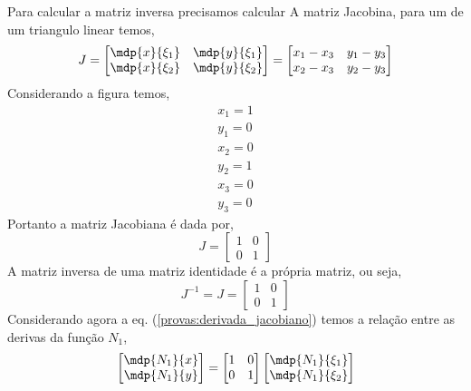 %
Para calcular a matriz inversa precisamos calcular A matriz Jacobina, para um de um triangulo linear temos,
%
\begin{equation}
J =	\begin{bmatrix}
		\mdp{x}{\xi_1}&\mdp{y}{\xi_1}\\
		\mdp{x}{\xi_2}&\mdp{y}{\xi_2}
	\end{bmatrix} =
    \begin{bmatrix}
  		x_1 - x_3&y_1 - y_3\\
	  	x_2 - x_3&y_2 - y_3
    \end{bmatrix} 
\end{equation}
%
Considerando a figura temos,
\begin{equation}
\begin{split}
x_1 = 1\\
y_1 = 0\\
x_2 = 0\\
y_2 = 1\\
x_3 = 0\\
y_3 = 0
\end{split}
\end{equation} 
% 
Portanto a matriz Jacobiana é dada por,
%
\begin{equation}
	J =	\begin{bmatrix}
		1&0\\
		0&1
		\end{bmatrix}
\end{equation}
%
A matriz inversa de uma matriz identidade é a própria matriz, ou seja,
%
\begin{equation}
	J^{-1} = J =	\begin{bmatrix}
		1&0\\
		0&1
	\end{bmatrix}
\end{equation}
%
Considerando agora a eq. (\ref{provas:derivada_jacobiano}) temos a relação entre as derivas da função $N_1$,
%
\begin{equation}
	\begin{bmatrix}
	\mdp{N_1}{x}\\
	\mdp{N_1}{y}
	\end{bmatrix}
     = 
	\begin{bmatrix}
	1&0\\
	0&1
	\end{bmatrix}          
	\begin{bmatrix}
	\mdp{N_1}{\xi_1}\\
	\mdp{N_1}{\xi_2}
	\end{bmatrix} 
\end{equation}
